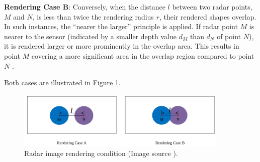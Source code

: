 \documentclass[report.tex]{subfiles}
\begin{document}
    \textbf{Rendering Case B}: Conversely, when the distance \( l \) between two radar points, \( M \) and \( N \), is less than twice the rendering radius \( r \), their rendered shapes overlap. In such instances, the ``nearer the larger'' principle is applied. If radar point \( M \) is nearer to the sensor (indicated by a smaller depth value \( d_M \) than \( d_N \) of point \( N \)), it is rendered larger or more prominently in the overlap area. This results in point \( M \) covering a more significant area in the overlap region compared to point \( N \) \cite{chang2020spatial}.

    Both cases are illustrated in Figure \ref{fig:saffcos_radar_image_rendering_condition}.

    \begin{figure}[h]
        \centering
        \includegraphics[width=0.9\textwidth]{images/methods/saf_fcos/radar image rendering condition.png}
        \caption{Radar image rendering condition (Image source \cite{chang2020spatial}).}
        \label{fig:saffcos_radar_image_rendering_condition}
    \end{figure}


            
\end{document}
